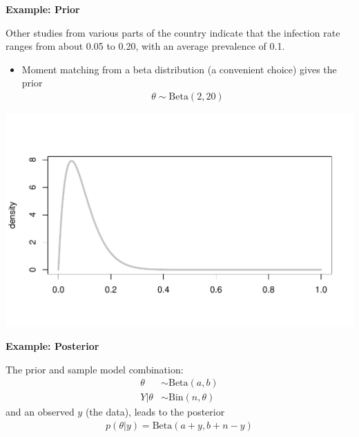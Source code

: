 \documentclass[12pt,xcolor=svgnames]{beamer}
\newcommand{\theme}{\color{FireBrick}}
\newcommand{\mr}[1]{\mathrm{#1}}
\newcommand{\sk}{\vspace{.4cm}}
\newcommand{\chap}[1]{{\theme \Large \bf #1} \sk}
\begin{document}
\begin{frame}
\chap{Example: Prior}

Other studies from various parts of the country indicate that the infection rate ranges from about
0.05 to 0.20, with an average prevalence of 0.1. 
\begin{itemize}
\item Moment matching from a beta distribution (a convenient choice) gives the prior
\begin{align*}
\theta \sim \mr{Beta} (2,20)
\end{align*}
\end{itemize}
\begin{center}
\includegraphics[scale=0.55,trim=10 50 0 125]{beta_prior}
\end{center}

\end{frame}


\begin{frame}
\chap{Example: Posterior}

The prior and sample model combination:
\begin{align*}
\theta & \sim \mr{Beta} (a,b)\\
Y|\theta &  \sim \mr{Bin} (n, \theta)
\end{align*}
and an observed $y$ (the data), leads to the posterior 
\begin{align*}
p(\theta|y)=\mr{Beta}(a+y, b+n-y)
\end{align*}

\end{frame}
\end{document}
